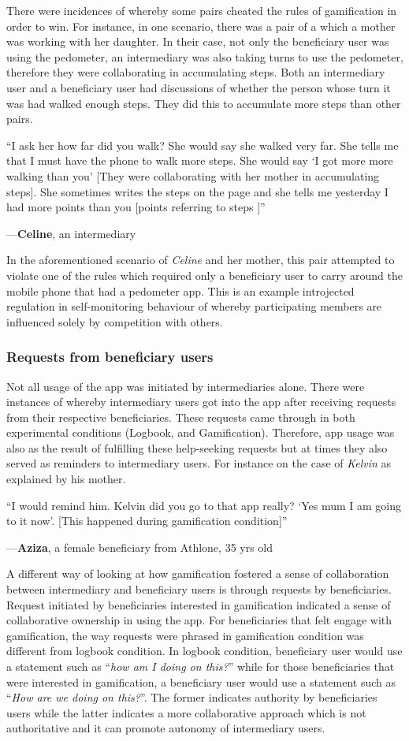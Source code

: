 \documentclass{sig-alternate}
\newenvironment{myquote}
               {\list{}{\rightmargin   \leftmargin
                        \parsep        0in }%
                \item\relax}
               {\endlist}
\newcommand{\userquote}[2]{\begin{samepage}\begin{myquote} 
     \em{\small{#2\begin{flushright}---#1\end{flushright}}}
   \end{myquote}\end{samepage}}
\begin{document}
There were incidences of whereby some pairs cheated the rules of gamification in order to win. For instance, in one scenario, there was a pair of a which a mother was working with her daughter. In their case, not only the beneficiary user was using the pedometer, an intermediary was also taking turns to use the pedometer, therefore they were collaborating in accumulating steps. Both an intermediary user and a beneficiary user had discussions of whether the person whose turn it was had walked enough steps. They did this to accumulate more steps than other pairs.

\userquote{\textbf{Celine}, an intermediary} {``I ask her how far did you walk?  She would say she walked very far. She tells me that I must have the phone to walk more steps. She would say `I got more more walking than you' [They were collaborating with her mother in accumulating steps]. She sometimes writes the steps on the page and she tells me yesterday I had more points than you [points referring to steps ]''}   

In the aforementioned scenario of \emph{Celine} and her mother, this pair attempted to violate one of the rules which required only a beneficiary user to carry around the mobile phone that had a pedometer app. This is an example introjected regulation in self-monitoring behaviour of whereby participating members are influenced solely by competition with others.
\subsubsection*{\textbf{Requests from beneficiary users}}
Not all usage of the app was initiated by intermediaries alone. There were instances of whereby intermediary users got into the app after receiving requests from their respective beneficiaries. These requests came through in both experimental conditions (Logbook, and Gamification). Therefore, app usage was also as the result of fulfilling these help-seeking requests but at times they also served as reminders to intermediary users. For instance on the case of \emph{Kelvin} as explained by his mother.

\userquote{\textbf{Aziza}, a female beneficiary from Athlone, 35 yrs old} {``I would remind him. Kelvin did you go to that app really? `Yes mum I am going to it now'. [This happened during gamification condition]''} 

A different way of looking at how gamification fostered a sense of collaboration between intermediary  and beneficiary users is through requests by beneficiaries. Request initiated by beneficiaries interested in gamification indicated a sense of collaborative ownership in using the app. For beneficiaries that felt engage with gamification, the way requests were phrased in gamification condition was different from logbook condition. In logbook condition, beneficiary user would use a statement such as ``\emph{how am I doing on this?}'' while for those beneficiaries that were interested in gamification, a beneficiary user would use a statement such as ``\emph{How are we doing on this?}''. The former indicates authority by beneficiaries users while the latter indicates a more collaborative approach which is not authoritative and it can promote autonomy of intermediary users.
\end{document}
